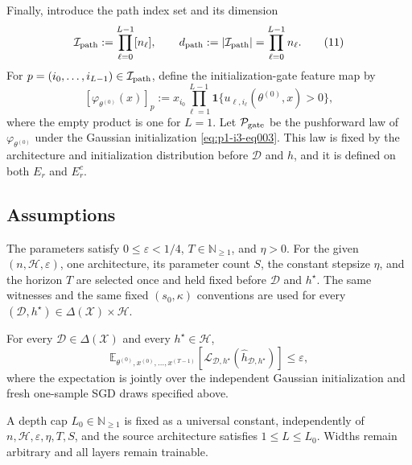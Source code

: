 Finally, introduce the path index set and its dimension
\[
\mathcal I_{\rm path}:=\prod_{\ell=0}^{L-1}[n_\ell],
\qquad
d_{\rm path}:=|\mathcal I_{\rm path}|
=\prod_{\ell=0}^{L-1}n_\ell.
\tag{11}\label{eq:p1-i3-eq011}
\]
For $p=(i_0,\ldots,i_{L-1})\in\mathcal I_{\rm path}$, define the
initialization-gate feature map by
\[
[\varphi_{\theta^{(0)}}(x)]_p
:=x_{i_0}\prod_{\ell=1}^{L-1}
\mathbf 1\{u_{\ell,i_\ell}(\theta^{(0)},x)>0\},
\tag{12}\label{eq:p1-i3-eq012}
\]
where the empty product is one for $L=1$.  Let
$\mathcal P_{\rm gate}$ be the pushforward law of
$\varphi_{\theta^{(0)}}$ under the Gaussian initialization \eqref{eq:p1-i3-eq003}.  This law is
fixed by the architecture and initialization distribution before
$\mathcal D$ and $h$, and it is defined on both $E_r$ and $E_r^c$.

\subsection{Assumptions}

\begin{assumption}
\label{assump:fixed-source-witnesses}
The parameters satisfy $0\leq\varepsilon<1/4$, $T\in\mathbb N_{\geq1}$,
and $\eta>0$.  For the given $(n,\mathcal H,\varepsilon)$, one architecture,
its parameter count $S$, the constant stepsize $\eta$, and the horizon $T$
are selected once and held fixed before $\mathcal D$ and $h^\star$.  The same
witnesses and the same fixed $(s_0,\kappa)$ conventions are used for every
$(\mathcal D,h^\star)\in\Delta(\mathcal X)\times\mathcal H$.
\end{assumption}

\begin{assumption}
\label{assump:universal-expected-success}
For every $\mathcal D\in\Delta(\mathcal X)$ and every
$h^\star\in\mathcal H$,
\[
\mathbb E_{\theta^{(0)},x^{(0)},\ldots,x^{(T-1)}}\!\left[
\mathcal L_{\mathcal D,h^\star}
(\widehat h_{\mathcal D,h^\star})
\right]\leq\varepsilon,
\tag{13}\label{eq:p1-i3-eq013}
\]
where the expectation is jointly over the independent Gaussian initialization
and fresh one-sample SGD draws specified above.
\end{assumption}

\begin{assumption}
\label{assump:constant-depth}
A depth cap $L_0\in\mathbb N_{\geq1}$ is fixed as a universal constant,
independently of $n,\mathcal H,\varepsilon,\eta,T,S$, and the source
architecture satisfies $1\leq L\leq L_0$.  Widths remain arbitrary and all
layers remain trainable.
\end{assumption}

